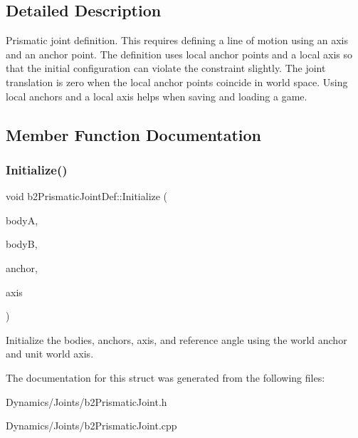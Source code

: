 \subsection{Detailed Description}
Prismatic joint definition. This requires defining a line of motion using an axis and an anchor point. The definition uses local anchor points and a local axis so that the initial configuration can violate the constraint slightly. The joint translation is zero when the local anchor points coincide in world space. Using local anchors and a local axis helps when saving and loading a game. 

\subsection{Member Function Documentation}
\mbox{\label{structb2PrismaticJointDef_ae60043bc22b077e8c59ab248dc34652f}} 
\subsubsection{\texorpdfstring{Initialize()}{Initialize()}}
{\footnotesize\ttfamily void b2\+Prismatic\+Joint\+Def\+::\+Initialize (\begin{DoxyParamCaption}\item[{\mbox{\hyperlink{classb2Body}{b2\+Body}} $\ast$}]{bodyA,  }\item[{\mbox{\hyperlink{classb2Body}{b2\+Body}} $\ast$}]{bodyB,  }\item[{const \mbox{\hyperlink{structb2Vec2}{b2\+Vec2}} \&}]{anchor,  }\item[{const \mbox{\hyperlink{structb2Vec2}{b2\+Vec2}} \&}]{axis }\end{DoxyParamCaption})}

Initialize the bodies, anchors, axis, and reference angle using the world anchor and unit world axis. 

The documentation for this struct was generated from the following files\+:\begin{DoxyCompactItemize}
\item 
Dynamics/\+Joints/b2\+Prismatic\+Joint.\+h\item 
Dynamics/\+Joints/b2\+Prismatic\+Joint.\+cpp\end{DoxyCompactItemize}
